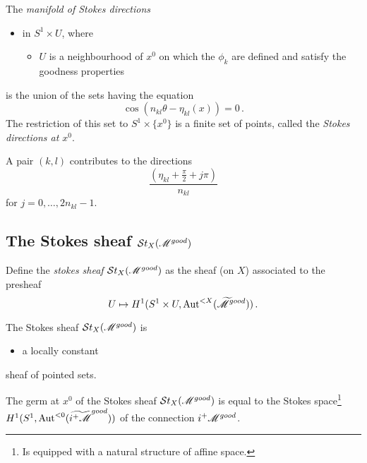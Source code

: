 \begin{defn}
  The \emph{manifold of Stokes directions}
  \begin{itemize}
    \item in $S^1\times U$, where
      \begin{itemize}
        \item $U$ is a neighbourhood of $x^0$ on which the $\phi_k$ are defined
          and satisfy the goodness properties
      \end{itemize}
  \end{itemize}
  is the union of the sets having the equation
  \[
    \cos(n_{kl}\theta-\eta_{kl}(x))=0 \,.
  \]
  The restriction of this set to $S^1\times\{x^0\}$ is a finite set of points,
  called the \emph{Stokes directions at $x^0$}.
  \begin{rem}
    A pair $(k,l)$ contributes to the directions
    \[
      \frac{\left(\eta_{kl}+\frac{\pi}{2}+j\pi\right)}{n_{kl}}
    \]
    for $j=0,\dots,2n_{kl}-1$.
  \end{rem}
\end{defn}
\begin{ex}
\end{ex}

\subsection{The Stokes sheaf $\mathcal{S}{}t_X(\mathscr{M}^{good})$}
\begin{defn}
  Define the \emph{stokes sheaf} $\mathcal{S}{}t_X(\mathscr{M}^{good})$ as the sheaf (on $X$)
  associated to the presheaf
  \[
    U\mapsto H^1(S^1\times U,\operatorname{Aut}^{<X}(\widetilde {\mathscr{M}}^{good}))\,.
  \]
\end{defn}
\begin{thm}
  The Stokes sheaf $\mathcal{S}{}t_X(\mathscr{M}^{good})$ is
  \begin{itemize}
    \item a locally constant
  \end{itemize}
  sheaf of pointed sets.
  \begin{comment}
    \begin{proof}
      \cite[p. 113]{sabbah2007isomonodromic}: paragraph 6.c.
    \end{proof}
  \end{comment}
\end{thm}
\begin{prop}
  The germ at $x^0$ of the Stokes sheaf $\mathcal{S}{}t_X(\mathscr{M}^{good})$ is equal to the
  Stokes space\footnote{Is equipped with a natural structure of affine space.}
  $H^1(S^1,\operatorname{Aut}^{<0}(\widetilde{i^+\mathscr{M}}^{good}))$ of the connection
  $i^+\mathscr{M}^{good}$.
\end{prop}

